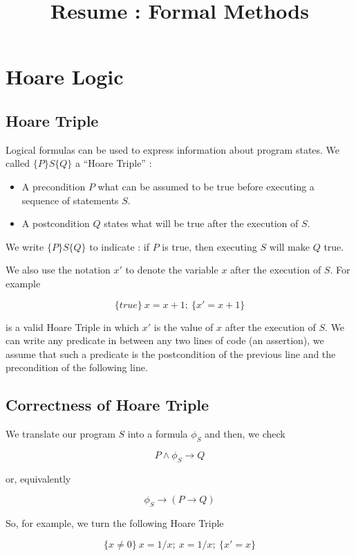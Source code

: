 \documentclass[a4paper,11pt]{report}
\title{Resume : Formal Methods}
\begin{document}
\maketitle

\chapter{Hoare Logic}

\section{Hoare Triple}

Logical formulas can be used to express information about program states. We
called $\{P\}S\{Q\}$ a ``Hoare Triple'' :

\begin{itemize}
\item A precondition $P$ what can be assumed to be true before executing a
  sequence of statements $S$.
\item A postcondition $Q$ states what will be true after the execution of $S$.
\end{itemize}

We write $\{P\}S\{Q\}$ to indicate : if $P$ is true, then executing $S$ will
make $Q$ true.

We also use the notation $x'$ to denote the variable $x$ after the execution of
$S$. For example

\[
  \{true\}\ x = x + 1;\ \{x' = x + 1\}
\]

is a valid Hoare Triple in which $x'$ is the value of $x$ after the execution
of $S$. We can write any predicate in between any two lines of code (an
assertion), we assume that such a predicate is the postcondition of the previous
line and the precondition of the following line.

\section{Correctness of Hoare Triple}

We translate our program $S$ into a formula $\phi_S$ and then, we check

\[
  P \wedge \phi_S \to Q
\]

or, equivalently

\[
  \phi_S \to (P \to Q)
\]

So, for example, we turn the following Hoare Triple

\[
  \{x \neq 0\}\ x=1/x;\ x=1/x; \ \{x' = x\}
\]
\end{document}

